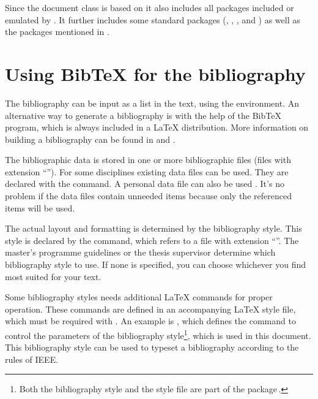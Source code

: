 Since the document class  is based on  it also
includes all packages included or emulated by .
It further includes some standard packages (, ,
, and ) as well as the packages mentioned in
.

\section{Using BibTeX for the bibliography}
\label{sec:bibtex}
The bibliography can be input as a list in the text, using the
 environment. An alternative way to generate a
bibliography is with the help of the BibTeX program, which is always
included in a LaTeX distribution. More information on building a
bibliography can be found in \cite{tamethebeast} and \cite{btxfaq}.

The bibliographic data is stored in one or more bibliographic files (files
with extension ``''). For some disciplines existing data files
can be used. They are declared with the  command. A
personal data file can also be used \cite[part~3]{tamethebeast}. It's no
problem if the data files contain unneeded items because only the
referenced items will be used.

The actual layout and formatting is determined by the bibliography style. This
style is declared by the  command, which refers to a file
with extension ``''. The master's programme guidelines or the thesis
supervisor determine which bibliography style to use. If none is specified, you
can choose whichever you find most suited for your text.

Some bibliography styles needs additional LaTeX commands for proper
operation. These commands are defined in an accompanying LaTeX style file,
which must be required with . An example is
, which defines the command  to control
the parameters of the  bibliography style\footnote{Both the
   bibliography style and the  style file
  are part of the  package\,\cite{pkg:IEEEtran}.}, which is
used in this document. This bibliography style can be used to typeset a
bibliography according to the rules of IEEE\@.

